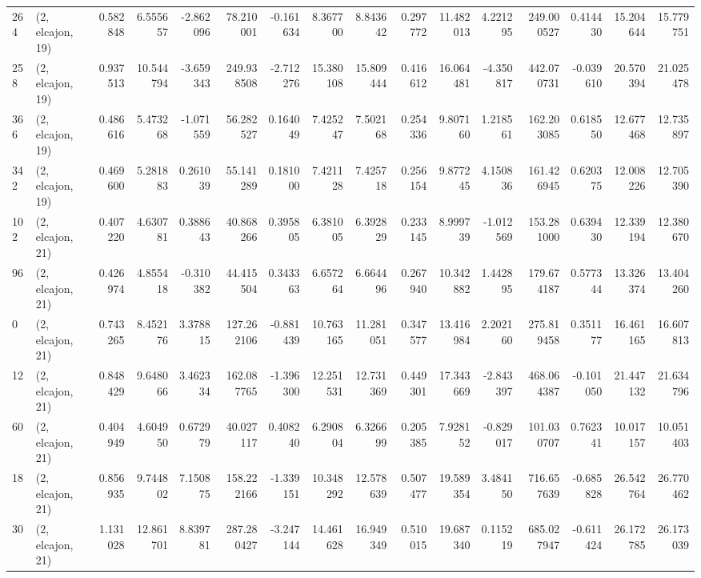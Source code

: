 \begin{tabular}{llrrrrrrrrrrrrrr}
264 &  (2, elcajon, 19) &   0.582848 &   6.555657 &  -2.862096 &    78.210001 &  -0.161634 &   8.367700 &   8.843642 &  0.297772 &  11.482013 &   4.221295 &    249.000527 &    0.414430 &   15.204644 &   15.779751 \\
258 &  (2, elcajon, 19) &   0.937513 &  10.544794 &  -3.659343 &   249.938508 &  -2.712276 &  15.380108 &  15.809444 &  0.416612 &  16.064481 &  -4.350817 &    442.070731 &   -0.039610 &   20.570394 &   21.025478 \\
366 &  (2, elcajon, 19) &   0.486616 &   5.473268 &  -1.071559 &    56.282527 &   0.164049 &   7.425247 &   7.502168 &  0.254336 &   9.807160 &   1.218561 &    162.203085 &    0.618550 &   12.677468 &   12.735897 \\
342 &  (2, elcajon, 19) &   0.469600 &   5.281883 &   0.261039 &    55.141289 &   0.181000 &   7.421128 &   7.425718 &  0.256154 &   9.877245 &   4.150836 &    161.426945 &    0.620375 &   12.008226 &   12.705390 \\
102 &  (2, elcajon, 21) &   0.407220 &   4.630781 &   0.388643 &    40.868266 &   0.395805 &   6.381005 &   6.392829 &  0.233145 &   8.999739 &  -1.012569 &    153.281000 &    0.639430 &   12.339194 &   12.380670 \\
96  &  (2, elcajon, 21) &   0.426974 &   4.855418 &  -0.310382 &    44.415504 &   0.343363 &   6.657264 &   6.664496 &  0.267940 &  10.342882 &   1.442895 &    179.674187 &    0.577344 &   13.326374 &   13.404260 \\
0   &  (2, elcajon, 21) &   0.743265 &   8.452176 &   3.378815 &   127.262106 &  -0.881439 &  10.763165 &  11.281051 &  0.347577 &  13.416984 &   2.202160 &    275.819458 &    0.351177 &   16.461165 &   16.607813 \\
12  &  (2, elcajon, 21) &   0.848429 &   9.648066 &   3.462334 &   162.087765 &  -1.396300 &  12.251531 &  12.731369 &  0.449301 &  17.343669 &  -2.843397 &    468.064387 &   -0.101050 &   21.447132 &   21.634796 \\
60  &  (2, elcajon, 21) &   0.404949 &   4.604950 &   0.672979 &    40.027117 &   0.408240 &   6.290804 &   6.326699 &  0.205385 &   7.928152 &  -0.829017 &    101.030707 &    0.762341 &   10.017157 &   10.051403 \\
18  &  (2, elcajon, 21) &   0.856935 &   9.744802 &   7.150875 &   158.222166 &  -1.339151 &  10.348292 &  12.578639 &  0.507477 &  19.589354 &   3.484150 &    716.657639 &   -0.685828 &   26.542764 &   26.770462 \\
30  &  (2, elcajon, 21) &   1.131028 &  12.861701 &   8.839781 &   287.280427 &  -3.247144 &  14.461628 &  16.949349 &  0.510015 &  19.687340 &   0.115219 &    685.027947 &   -0.611424 &   26.172785 &   26.173039 \\

\end{tabular}
